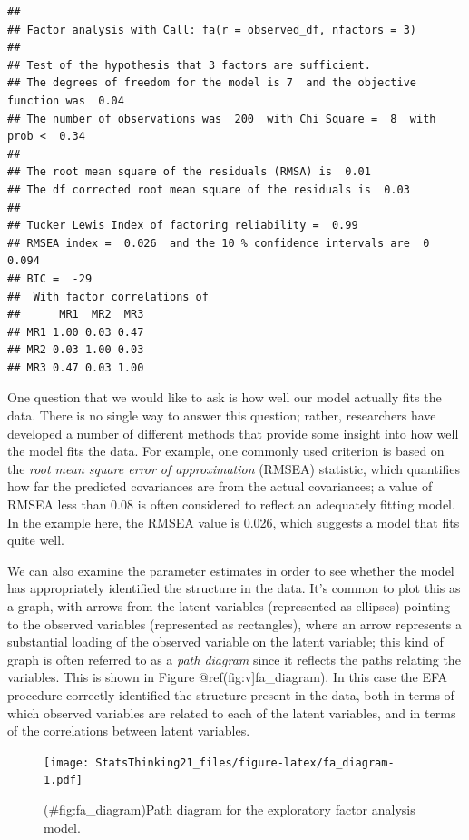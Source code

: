 \documentclass[
  12pt,
]{book}
\begin{document}
\begin{verbatim}
## 
## Factor analysis with Call: fa(r = observed_df, nfactors = 3)
## 
## Test of the hypothesis that 3 factors are sufficient.
## The degrees of freedom for the model is 7  and the objective function was  0.04 
## The number of observations was  200  with Chi Square =  8  with prob <  0.34 
## 
## The root mean square of the residuals (RMSA) is  0.01 
## The df corrected root mean square of the residuals is  0.03 
## 
## Tucker Lewis Index of factoring reliability =  0.99
## RMSEA index =  0.026  and the 10 % confidence intervals are  0 0.094
## BIC =  -29
##  With factor correlations of 
##      MR1  MR2  MR3
## MR1 1.00 0.03 0.47
## MR2 0.03 1.00 0.03
## MR3 0.47 0.03 1.00
\end{verbatim}

One question that we would like to ask is how well our model actually fits the data. There is no single way to answer this question; rather, researchers have developed a number of different methods that provide some insight into how well the model fits the data. For example, one commonly used criterion is based on the \emph{root mean square error of approximation} (RMSEA) statistic, which quantifies how far the predicted covariances are from the actual covariances; a value of RMSEA less than 0.08 is often considered to reflect an adequately fitting model. In the example here, the RMSEA value is 0.026, which suggests a model that fits quite well.

We can also examine the parameter estimates in order to see whether the model has appropriately identified the structure in the data. It's common to plot this as a graph, with arrows from the latent variables (represented as ellipses) pointing to the observed variables (represented as rectangles), where an arrow represents a substantial loading of the observed variable on the latent variable; this kind of graph is often referred to as a \emph{path diagram} since it reflects the paths relating the variables. This is shown in Figure @ref(fig:v{]}fa\_diagram). In this case the EFA procedure correctly identified the structure present in the data, both in terms of which observed variables are related to each of the latent variables, and in terms of the correlations between latent variables.

\begin{figure}
\centering
\texttt{[image: StatsThinking21\_files/figure-latex/fa\_diagram-1.pdf]}
\caption{(\#fig:fa\_diagram)Path diagram for the exploratory factor analysis model.}
\end{figure}
\end{document}
